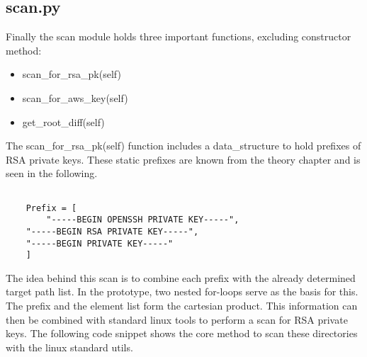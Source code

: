 \subsection{scan.py}
\label{ch:practical_realization:implementation:scan}
Finally the scan module holds three important functions, excluding constructor method:
\begin{itemize}
\item scan\_for\_rsa\_pk(self)
\item scan\_for\_aws\_key(self)
\item get\_root\_diff(self)
\end{itemize}
The scan\_for\_rsa\_pk(self) function includes a data\_structure to hold prefixes of RSA private keys.
These static prefixes are known from the theory chapter and is seen in the following.
\lstset{language=Python}          %
\begin{lstlisting}[]  % Start your code-block
	
    Prefix = [
    	"-----BEGIN OPENSSH PRIVATE KEY-----",
	"-----BEGIN RSA PRIVATE KEY-----",
	"-----BEGIN PRIVATE KEY-----"
	]
\end{lstlisting}
The idea behind this scan is to combine each prefix with the already determined target path list.
In the prototype, two nested for-loops serve as the basis for this. The prefix and the element list form the cartesian product.
This information can then be combined with standard linux tools to perform a scan for RSA private keys.
The following code snippet shows the core method to scan these directories with the linux standard utils.


